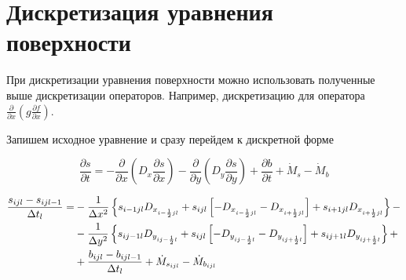 \section*{Дискретизация уравнения поверхности}

При дискретизации уравнения поверхности можно использовать
полученные выше дискретизации операторов. Например,
дискретизацию для оператора
$
    \frac
        {\partial}
        {\partial x}
    \left(
        g
        \frac
            {\partial f}
            {\partial x}
    \right)
$.

Запишем исходное уравнение и сразу перейдем к дискретной форме

\begin{equation*}
    \frac
        {\partial s}
        {\partial t}
    =
    -
    \frac
        {\partial}
        {\partial x}
    \left(
        D_{x}
        \frac
            {\partial s}
            {\partial x}
    \right)
    -
    \frac
        {\partial}
        {\partial y}
    \left(
        D_{y}
        \frac
            {\partial s}
            {\partial y}
    \right)
    +
    \frac
        {\partial b}
        {\partial t}
    +
    \dot{M}_s
    -
    \dot{M}_b
\end{equation*}

\begin{equation*}
    \begin{split}
        \frac
        {s_{ijl} - s_{ijl-1}}
        {\Delta t_{l}}
        =
        &
        -
        \frac
            {1}
            {\Delta x^2}
        \left\{
            s_{i-1jl}
            D_{x_{i-\frac{1}{2} jl}}
            +
            s_{ijl}
            \left[
                -
                D_{x_{i-\frac{1}{2} jl}}
                -
                D_{x_{i+\frac{1}{2} jl}}
            \right]
            +
            s_{i+1jl}
            D_{x_{i+\frac{1}{2} jl}}
        \right\}
        -
        \\ &
        -
        \frac
            {1}
            {\Delta y^2}
        \left\{
            s_{ij-1l}
            D_{y_{ij-\frac{1}{2} l}}
            +
            s_{ijl}
            \left[
                -
                D_{y_{ij-\frac{1}{2} l}}
                -
                D_{y_{ij+\frac{1}{2} l}}
            \right]
            +
            s_{ij+1l}
            D_{y_{ij+\frac{1}{2} l}}
        \right\}
        +
        \\ &
        +
        \frac
            {b_{ijl} - b_{ijl-1}}
            {\Delta t_{l}}
        +
        \dot{M}_{s_{ijl}}
        -
        \dot{M}_{b_{ijl}}        
    \end{split}
\end{equation*}

